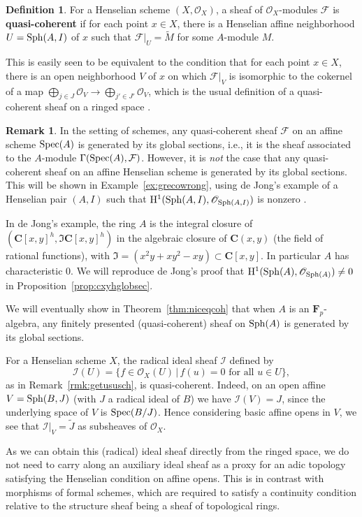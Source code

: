 \documentclass[12pt]{article}
\renewcommand{\O}{\mathscr{O}}
\newcommand{\C}{\mathbf{C}}
\newcommand{\F}{\mathcal{F}}
\newcommand{\spec}{{\rm Spec}}
\newcommand{\sph}{{\rm Sph}}
\newcommand{\mc}[1]{\mathcal{#1}}
\newcommand{\mf}[1]{\mathfrak{#1}}
\renewcommand{\H}{{\rm H}}
\newcommand{\spcite}[2]{\cite[\href{https://stacks.math.columbia.edu/tag/#1}{{#2} {#1}}]{stackp}}
\theoremstyle{definition}
\newtheorem{definition}[theorem]{Definition}
\newtheorem{remark}[theorem]{Remark}
\newenvironment{example}
  {\pushQED{\qed}\renewcommand{\qedsymbol}{$\blacksquare$}\examplex}
  {\popQED\endexamplex}
\numberwithin{equation}{subsection}
\begin{document}
\begin{definition}\label{def:qcohshf} For a Henselian scheme $(X,\O_X)$, a sheaf of $\O_X$-modules $\F$ is {\bf quasi-coherent} if for each point $x \in X$, there is a Henselian affine neighborhood $U=\sph(A,I)$ of $x$ such that $\F|_U=\widetilde{M}$ for some $A$-module $M$.

This is easily seen to be equivalent to the condition that for each point $x \in X$, there is an open neighborhood $V$ of $x$ on which $\F|_V$ is isomorphic to the cokernel of a map $\bigoplus_{j \in J} \O_V \to \bigoplus_{j' \in J'} \O_V$, which is the usual definition of a quasi-coherent sheaf on a ringed space \spcite{01BK}{Lemma}.
\end{definition}
\begin{remark}\label{rmk:cxyhglobsec}
In the setting of schemes, any quasi-coherent sheaf $\F$ on an affine scheme $\spec(A)$ is generated by its global sections, i.e., it is the sheaf associated to the $A$-module $\Gamma(\spec(A),\F)$. However, it is {\it not} the case that any quasi-coherent sheaf on an affine Henselian scheme is generated by its global sections. This will be shown in Example~\ref{ex:grecowrong}, using de Jong's example of a Henselian pair $(A,I)$ such that $\H^1(\sph(A,I),\O_{\sph(A,I)})$ is nonzero \cite{nothmbblog}.

In de Jong's example, the ring $A$ is the integral closure of $(\C[x,y]^h,\mf{I}\C[x,y]^h)$ in the algebraic closure of $\C(x,y)$ (the field of rational functions), with $\mf{I}=(x^2y+xy^2-xy) \subset \C[x,y]$. In particular $A$ has characteristic $0$. We will reproduce de Jong's proof that $\H^1(\sph(A),\O_{\sph(A)}) \ne 0$ in Proposition~\ref{prop:cxyhglobsec}.

We will eventually show in Theorem~\ref{thm:niceqcoh} that when $A$ is an $\mathbf{F}_p$-algebra, any finitely presented (quasi-coherent) sheaf on $\sph(A)$ is generated by its global sections.
\end{remark}



\begin{example}\label{ex:qcideal}
For a Henselian scheme $X$, the radical ideal sheaf $\mc{I}$ defined by
$$\mc{I}(U) = \{f \in \O_X(U) \,|\, f(u) = 0 \mbox{ for all } u \in U\},$$ as in Remark~\ref{rmk:getususch},
is quasi-coherent. Indeed, on an open affine $V = \sph(B,J)$ (with $J$ a radical ideal of $B$) we have $\mc{I}(V) = J$, since the underlying space of $V$ is $\spec(B/J)$. Hence considering basic affine opens in $V$, we see that $\mc{I}|_V = \widetilde{J}$ as subsheaves of $\O_X$.

As we can obtain this (radical) ideal sheaf directly from the ringed space, we do not need to carry along an auxiliary ideal sheaf as a proxy for an adic topology satisfying the Henselian condition on affine opens. This is in contrast with morphisms of formal schemes, which are required to satisfy a continuity condition relative to the structure sheaf being a sheaf of topological rings.\end{example}
\end{document}
